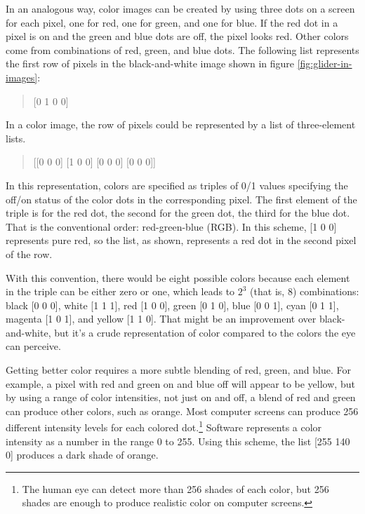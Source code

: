 In an analogous way, color images can be created by using three dots on a screen
for each pixel,
one for red, one for green, and one for blue.
If the red dot in a pixel is on and the green and blue dots
are off, the pixel looks red. Other colors come from combinations
of red, green, and blue dots.
The following list represents the first row of pixels
in the black-and-white image shown in
figure \ref{fig:glider-in-images}:
\begin{quote}
    \textsf{[0 1 0 0]}
\end{quote}
In a color image, the row of pixels could be represented by
a list of three-element lists.
\begin{quote}
    \textsf{[[0 0 0] [1 0 0] [0 0 0] [0 0 0]]}
\end{quote}
In this representation, colors are specified as triples of 0/1 values
specifying the off/on status of the color dots in the corresponding pixel.
The first element of the triple is for the red dot, the second
for the green dot, the third for the blue dot.
That is the conventional order:
red-green-blue (RGB).
In this scheme, \textsf{[1 0 0]} represents pure red,
so the list, as shown, represents a red dot in the second pixel of the row.

With this convention, there would be eight possible colors because
each element in the triple can be either zero or one,
which leads to $2^3$ (that is, $8$) combinations:
black \textsf{[0 0 0]},
white \textsf{[1 1 1]},
red \textsf{[1 0 0]},
green \textsf{[0 1 0]},
blue \textsf{[0 0 1]},
cyan \textsf{[0 1 1]},
magenta \textsf{[1 0 1]},
and
yellow \textsf{[1 1 0]}.
That might be an improvement over black-and-white,
but it's a crude representation of color
compared to the colors the eye can perceive.

Getting better color requires a more subtle blending of
red, green, and blue. For example, a pixel with red and green
on and blue off will appear to be yellow,
but by using a range of color intensities,
not just on and off, a blend of red and green can produce other
colors, such as orange. Most computer screens
can produce 256 different intensity levels for each colored dot.\footnote{The
human eye can detect more than 256 shades of
each color, but 256 shades are enough to produce realistic color
on computer screens.}
Software represents a color intensity as a number
in the range 0 to 255.
Using this scheme, the list \textsf{[255 140 0]} produces
a dark shade of orange.

